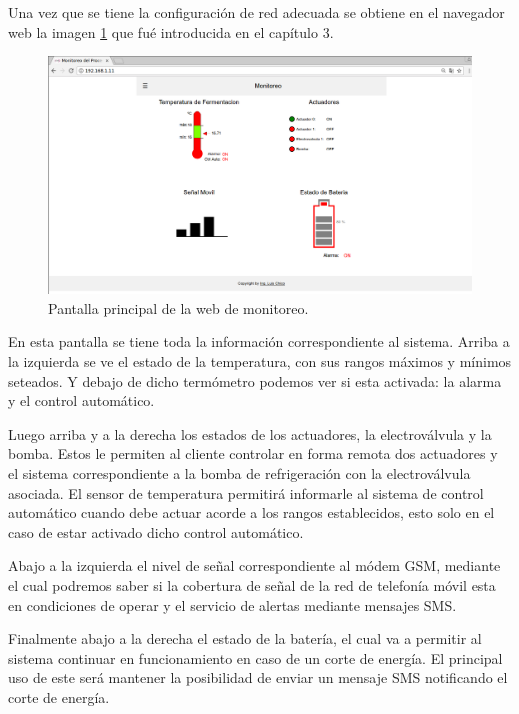 Una vez que se tiene la configuración de red adecuada se obtiene en el navegador web la imagen \ref{fig:web_monitoreo} que fué introducida en el capítulo 3.

\begin{figure}[h]
  \centering
  \includegraphics[scale=.25]{./Figures/web_monitoreo.png}
  \caption{Pantalla principal de la web de monitoreo.}
  \label{fig:web_monitoreo}
\end{figure}

En esta pantalla se tiene toda la información correspondiente al sistema. 
Arriba a la izquierda se ve el estado de la temperatura, con sus rangos máximos y mínimos seteados. Y debajo de dicho termómetro podemos ver si esta activada: la alarma y el control automático.

Luego arriba y a la derecha los estados de los actuadores, la electroválvula y la bomba. Estos le permiten al cliente controlar en forma remota dos actuadores y el sistema correspondiente a la bomba de refrigeración con la electroválvula asociada. El sensor de temperatura permitirá informarle al sistema de control automático cuando debe actuar acorde a los rangos establecidos, esto solo en el caso de estar activado dicho control automático. 

Abajo a la izquierda el nivel de señal correspondiente al módem GSM, mediante el cual podremos saber si la cobertura de señal de la red de telefonía móvil esta en condiciones de operar y el servicio de alertas mediante mensajes SMS. 

Finalmente abajo a la derecha el estado de la batería, el cual va a permitir al sistema continuar en funcionamiento en caso de un corte de energía. El principal uso de este será mantener la posibilidad de enviar un mensaje SMS notificando el corte de energía.



